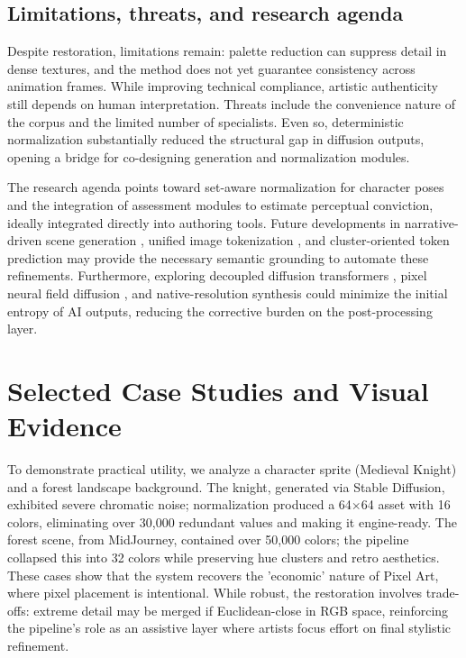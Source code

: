 \documentclass[runningheads]{llncs}
\begin{document}
\subsection{Limitations, threats, and research agenda}

Despite restoration, limitations remain: palette reduction can suppress detail in dense textures, and the method does not yet guarantee consistency across animation frames. While improving technical compliance, artistic authenticity still depends on human interpretation. Threats include the convenience nature of the corpus and the limited number of specialists. Even so, deterministic normalization substantially reduced the structural gap in diffusion outputs, opening a bridge for co-designing generation and normalization modules.

The research agenda points toward set-aware normalization for character poses and the integration of assessment modules to estimate perceptual conviction, ideally integrated directly into authoring tools. Future developments in narrative-driven scene generation \cite{chen2025narrative}, unified image tokenization \cite{qu2024tokenflow,zha2024language}, and cluster-oriented token prediction \cite{hu2025improving} may provide the necessary semantic grounding to automate these refinements. Furthermore, exploring decoupled diffusion transformers \cite{wang2025ddt}, pixel neural field diffusion \cite{wang2025pixnerd}, and native-resolution synthesis \cite{wang2025native} could minimize the initial entropy of AI outputs, reducing the corrective burden on the post-processing layer.


\section{Selected Case Studies and Visual Evidence}

To demonstrate practical utility, we analyze a character sprite (Medieval Knight) and a forest landscape background. The knight, generated via Stable Diffusion, exhibited severe chromatic noise; normalization produced a 64$\times$64 asset with 16 colors, eliminating over 30,000 redundant values and making it engine-ready. The forest scene, from MidJourney, contained over 50,000 colors; the pipeline collapsed this into 32 colors while preserving hue clusters and retro aesthetics. These cases show that the system recovers the 'economic' nature of Pixel Art, where pixel placement is intentional. While robust, the restoration involves trade-offs: extreme detail may be merged if Euclidean-close in RGB space, reinforcing the pipeline's role as an assistive layer where artists focus effort on final stylistic refinement.
\end{document}
